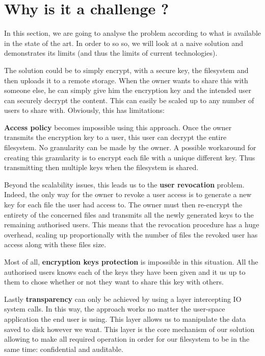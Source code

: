 \documentclass[../main.tex]{subfiles}
\begin{document}
\section{Why is it a challenge ?}
\label{section:problem:why_a_challenge}

\par In this section, we are going to analyse the problem according to what is available in the state of the art. In order to so so, we will look at a naive solution and demonstrates its limits (and thus the limits of current technologies).
\par The solution could be to simply encrypt, with a secure key, the filesystem and then uploads it to a remote storage. When the owner wants to share this with someone else, he can simply give him the encryption key and the intended user can securely decrypt the content. This can easily be scaled up to any number of users to share with. Obviously, this has limitations:
\par \textbf{Access policy} becomes impossible using this approach. Once the owner transmits the encryption key to a user, this user can decrypt the entire filesystem. No granularity can be made by the owner. A possible workaround for creating this granularity is to encrypt each file with a unique different key. Thus transmitting then multiple keys when the filesystem is shared.
\par Beyond the scalability issues, this leads us to the \textbf{user revocation} problem. Indeed, the only way for the owner to revoke a user access is to generate a new key for each file the user had access to. The owner must then re-encrypt the entirety of the concerned files and transmits all the newly generated keys to the remaining authorised users. This means that the revocation procedure has a huge overhead, scaling up proportionally with the number of files the revoked user has access along with these files size.
\par Most of all, \textbf{encryption keys protection} is impossible in this situation. All the authorised users knows each of the keys they have been given and it us up to them to chose whether or not they want to share this key with others.
\par Lastly \textbf{transparency} can only be achieved by using a layer intercepting IO system calls. In this way, the approach works no matter the user-space application the end user is using. This layer allows us to manipulate the data saved to disk however we want. This layer is the core mechanism of our solution allowing to make all required operation in order for our filesystem to be in the same time: confidential and auditable.
\end{document}
